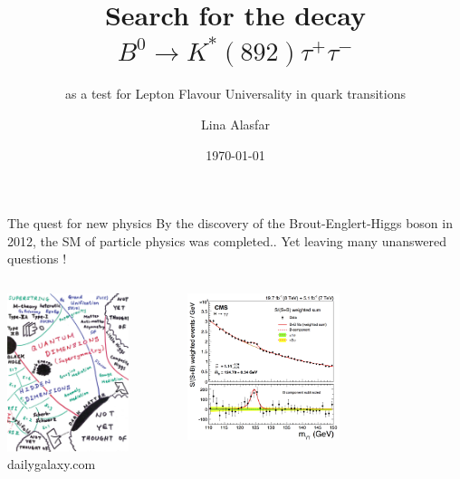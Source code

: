 \documentclass[9pt,usenames,dvipsnames]{beamer}
\title{Search for the decay  $B^0 \to K^*(892) \tau^+ \tau^-$  }
\subtitle{as a test for Lepton Flavour Universality in quark transitions }
\author{Lina Alasfar}
\institute{Max-Planck-Institute for Nuclear Physics, Heidelberg\\ LHCb Collaboration }
\date{\today}
\begin{document}
\titlepage

\begin{frame}{The quest for new physics}
By the discovery of the Brout-Englert-Higgs boson in 2012, the SM of particle physics was completed.. Yet leaving many unanswered questions !
	\begin{columns}[c]
		\centering
	\includegraphics[width= 0.75\textwidth]{./assets/particlephysics}\\ {\tiny  dailygalaxy.com}
		\begin{center}
			\includegraphics[width= 0.55\textwidth]{./assets/higgs}\\

\end{center}
\end{columns}
\end{frame}
\end{document}
